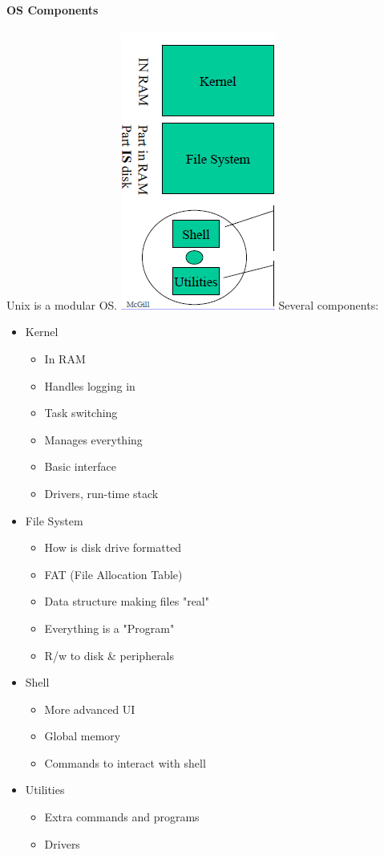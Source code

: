 \documentclass[12 pt]{article}
\begin{document}
	\paragraph{OS Components} Unix is a modular OS. \includegraphics[scale=0.6]{osc} Several components: 
	\begin{itemize}
		\item Kernel
		\begin{itemize}
			\item In RAM
			\item Handles logging in
			\item Task switching
			\item Manages everything
			\item Basic interface
			\item Drivers, run-time stack
		\end{itemize}
		\item File System
		\begin{itemize}
			\item How is disk drive formatted
			\item FAT (File Allocation Table)
			\item Data structure making files "real"
			\item Everything is a "Program"
			\item R/w to disk \& peripherals
		\end{itemize}
		\item Shell
		\begin{itemize}
			\item More advanced UI
			\item Global memory
			\item Commands to interact with shell
		\end{itemize}
		\item Utilities
		\begin{itemize}
			\item Extra commands and programs
			\item Drivers
		\end{itemize}
	\end{itemize}
\end{document}
